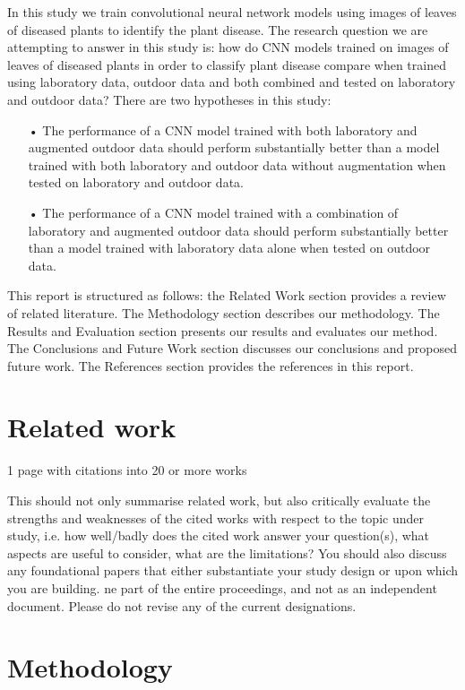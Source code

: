 \documentclass[conference]{IEEEtran}
\begin{document}
In this study we train convolutional neural network models using images of leaves of diseased plants to identify the plant disease. The research question we are attempting to answer in this study is: how do CNN models trained on images of leaves of diseased plants in order to classify plant disease compare when trained using laboratory data, outdoor data and both combined and tested on laboratory and outdoor data? There are two hypotheses in this study:
\begin{itemize}
\item[•]The performance of a CNN model trained with both laboratory and augmented outdoor data should perform substantially better than a model trained with both laboratory and outdoor data without augmentation when tested on laboratory and outdoor data. 
\item[•]The performance of a CNN model trained with a combination of laboratory and augmented outdoor data should perform substantially better than a model trained with laboratory data alone when tested on outdoor data.
\end{itemize}  

 

This report is structured as follows: the Related Work section provides a review of related literature. The Methodology section describes our methodology. The Results and Evaluation section presents our results and evaluates our method. The Conclusions and Future Work section discusses our conclusions and proposed future work. The References section provides the references in this report.

\section{Related work}
1 page with citations into 20 or more works  

This should not only summarise related work, but also critically evaluate the strengths and weaknesses of the cited works with respect to the topic under study, i.e. how well/badly does the cited work answer your question(s), what aspects are useful to consider, what are the limitations? You should also discuss any foundational papers that either substantiate your study design or upon which you are building. ne part of the entire proceedings, and not as an independent document. Please do not revise any of the current designations. 

\section{Methodology }
\end{document}
